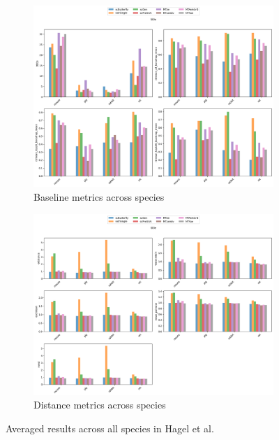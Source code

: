 \documentclass[12pt, a4paper]{article}
\begin{document}
\begin{figure}[h!]
    \centering
    \begin{subfigure}[t]{0.48\textwidth}
        \centering
        \includegraphics[width=\textwidth]{selected_benchmarking_cell_type_baseline_metrics_cross_species.png}
        \caption{Baseline metrics across species}
        \label{}
    \end{subfigure}
    \hfill
    \begin{subfigure}[t]{0.48\textwidth}
        \centering
        \includegraphics[width=\textwidth]{selected_benchmarking_cell_type_distance_metrics_cross_species.png}
        \caption{Distance metrics across species}
        \label{}
    \end{subfigure}
    \caption{Averaged results across all species in Hagel et al. \cite{hagai2018gene}}
    \label{fig:eval_cross_species}
\end{figure}
\end{document}
